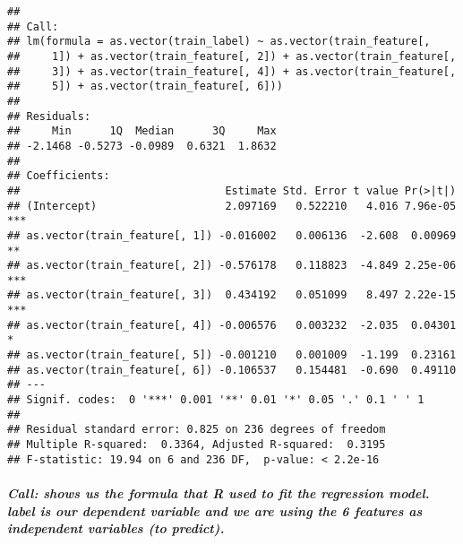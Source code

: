 \documentclass[
]{article}
\begin{document}
\begin{verbatim}
## 
## Call:
## lm(formula = as.vector(train_label) ~ as.vector(train_feature[, 
##     1]) + as.vector(train_feature[, 2]) + as.vector(train_feature[, 
##     3]) + as.vector(train_feature[, 4]) + as.vector(train_feature[, 
##     5]) + as.vector(train_feature[, 6]))
## 
## Residuals:
##     Min      1Q  Median      3Q     Max 
## -2.1468 -0.5273 -0.0989  0.6321  1.8632 
## 
## Coefficients:
##                                Estimate Std. Error t value Pr(>|t|)    
## (Intercept)                    2.097169   0.522210   4.016 7.96e-05 ***
## as.vector(train_feature[, 1]) -0.016002   0.006136  -2.608  0.00969 ** 
## as.vector(train_feature[, 2]) -0.576178   0.118823  -4.849 2.25e-06 ***
## as.vector(train_feature[, 3])  0.434192   0.051099   8.497 2.22e-15 ***
## as.vector(train_feature[, 4]) -0.006576   0.003232  -2.035  0.04301 *  
## as.vector(train_feature[, 5]) -0.001210   0.001009  -1.199  0.23161    
## as.vector(train_feature[, 6]) -0.106537   0.154481  -0.690  0.49110    
## ---
## Signif. codes:  0 '***' 0.001 '**' 0.01 '*' 0.05 '.' 0.1 ' ' 1
## 
## Residual standard error: 0.825 on 236 degrees of freedom
## Multiple R-squared:  0.3364, Adjusted R-squared:  0.3195 
## F-statistic: 19.94 on 6 and 236 DF,  p-value: < 2.2e-16
\end{verbatim}

\hypertarget{call-shows-us-the-formula-that-r-used-to-fit-the-regression-model.-label-is-our-dependent-variable-and-we-are-using-the-6-features-as-independent-variables-to-predict.}{%
\subparagraph{Call: shows us the formula that R used to fit the
regression model. label is our dependent variable and we are using the 6
features as independent variables (to
predict).}\label{call-shows-us-the-formula-that-r-used-to-fit-the-regression-model.-label-is-our-dependent-variable-and-we-are-using-the-6-features-as-independent-variables-to-predict.}}
\end{document}
